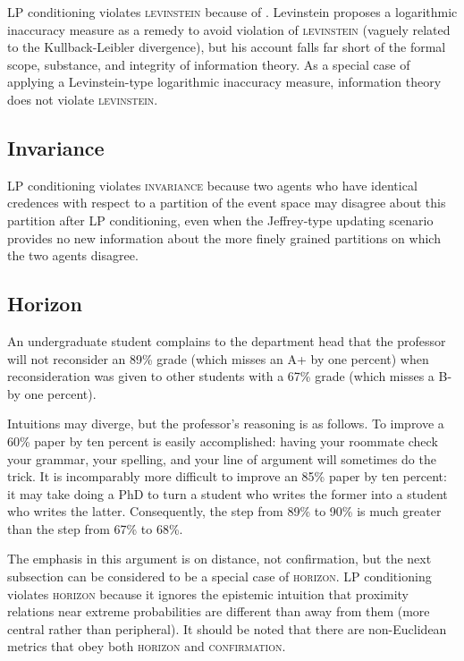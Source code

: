 \documentclass[11pt]{article} \usepackage{october} \onehalfspacing
\begin{document}
LP conditioning violates \textsc{levinstein} because of 
. Levinstein proposes a logarithmic
inaccuracy measure as a remedy to avoid violation of
\textsc{levinstein} (vaguely related to the Kullback-Leibler
divergence), but his account falls far short of the formal scope,
substance, and integrity of information theory. As a special case of
applying a Levinstein-type logarithmic inaccuracy measure, information
theory does not violate \textsc{levinstein}.

\subsection{Invariance}
\label{Invariance}

LP conditioning violates \textsc{invariance} because two agents who
have identical credences with respect to a partition of the event
space may disagree about this partition after LP conditioning, even
when the Jeffrey-type updating scenario provides no new information
about the more finely grained partitions on which the two agents
disagree.

\subsection{Horizon}
\label{Horizon}

\begin{quotex}
  \label{ex:complaint} An
  undergraduate student complains to the department head that the
  professor will not reconsider an 89\% grade (which misses an A+ by
  one percent) when reconsideration was given to other students with a
  67\% grade (which misses a B- by one percent).
\end{quotex}

Intuitions may diverge, but the professor's reasoning is as follows.
To improve a 60\% paper by ten percent is easily accomplished: having
your roommate check your grammar, your spelling, and your line of
argument will sometimes do the trick. It is incomparably more
difficult to improve an 85\% paper by ten percent: it may take doing a
PhD to turn a student who writes the former into a student who writes
the latter. Consequently, the step from 89\% to 90\% is much greater
than the step from 67\% to 68\%.

The emphasis in this argument is on distance, not confirmation, but
the next subsection can be considered to be a special case of
\textsc{horizon}. LP conditioning violates \textsc{horizon} because it
ignores the epistemic intuition that proximity relations near extreme
probabilities are different than away from them (more central rather
than peripheral). It should be noted that there are non-Euclidean
metrics that obey both \textsc{horizon} and \textsc{confirmation}.
\end{document}

